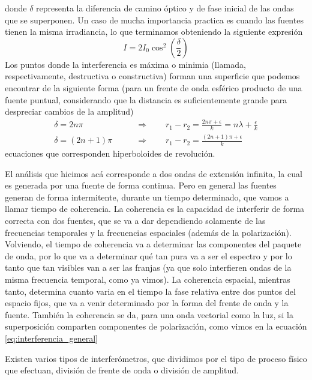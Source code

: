 \documentclass[a4paper,spanish]{article}
\numberwithin{equation}{section}
\begin{document}
	donde $\delta$ representa la diferencia de camino \'optico y de fase inicial de las ondas que se superponen. Un caso de mucha importancia practica es cuando las fuentes tienen la misma irradiancia, lo que terminamos obteniendo la siguiente expresi\'on
	\begin{equation}
		I = 2 I_0 \cos^2\left(\frac{\delta}{2}\right)
		\label{eq:interferencia_patron_clasico}
	\end{equation}
	Los puntos donde la interferencia es m\'axima o minimia (llamada, respectivamente, destructiva o constructiva) forman una superficie que podemos encontrar de la siguiente forma (para un frente de onda esf\'erico producto de una fuente puntual, considerando que la distancia es suficientemente grande para despreciar cambios de la amplitud)
	\begin{align}
		\delta = 2n\pi \qquad &\Rightarrow \qquad r_1 - r_2 = \frac{2n\pi + \epsilon}{k} = n\lambda + \frac{\epsilon}{k}\\
		\delta = (2n + 1)\pi \qquad &\Rightarrow \qquad r_1 - r_2 = \frac{(2n + 1)\pi + \epsilon}{k}
	\end{align}
	ecuaciones que corresponden hiperboloides de revoluci\'on.
	
	El an\'alisis que hicimos ac\'a corresponde a dos ondas de extensi\'on infinita, la cual es generada por una fuente de forma continua. Pero en general las fuentes generan de forma intermitente, durante un tiempo determinado, que vamos a llamar tiempo de coherencia. La coherencia es la capacidad de interferir de forma correcta con dos fuentes, que se va a dar dependiendo solamente de las frecuencias temporales y la frecuencias espaciales (adem\'as de la polarizaci\'on). Volviendo, el tiempo de coherencia va a determinar las componentes del paquete de onda, por lo que va a determinar qu\'e tan pura va a ser el espectro y por lo tanto que tan visibles van a ser las franjas (ya que solo interfieren ondas de la misma frecuencia temporal, como ya vimos). La coherencia espacial, mientras tanto, determina cuanto varia en el tiempo la fase relativa entre dos puntos del espacio fijos, que va a venir determinado por la forma del frente de onda y la fuente. Tambi\'en la coherencia se da, para una onda vectorial como la luz, si la superposici\'on comparten componentes de polarizaci\'on, como vimos en la ecuaci\'on \ref{eq:interferencia_general}
	
	Existen varios tipos de interfer\'ometros, que dividimos por el tipo de proceso f\'isico que efectuan, divisi\'on de frente de onda o divisi\'on de amplitud. 
	
\end{document}
